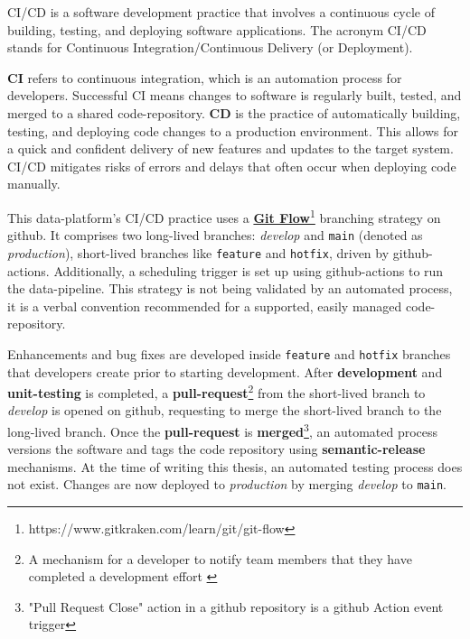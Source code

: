CI/CD is a software development practice that involves a continuous cycle of building, testing, and deploying software applications. The acronym CI/CD stands for Continuous Integration/Continuous Delivery (or Deployment).

\textbf{CI} refers to continuous integration, which is an automation process for developers. Successful CI means changes to software is regularly built, tested, and merged to a shared \gls{code-repository}. \textbf{CD} is the practice of automatically building, testing, and deploying code changes to a production environment. This allows for a quick and confident delivery of new features and updates to the target system. CI/CD mitigates risks of errors and delays that often occur when deploying code manually.

This \gls{data-platform}'s CI/CD practice uses a \href{https://www.gitkraken.com/learn/git/git-flow}{\textbf{Git Flow}}\footnote{https://www.gitkraken.com/learn/git/git-flow} branching strategy on \gls{github}. It comprises two long-lived branches: \textit{develop} and \texttt{main} (denoted as \textit{production}), short-lived branches like \texttt{feature} and \texttt{hotfix}, driven by \gls{github-actions}. Additionally, a scheduling trigger is set up using \gls{github-actions} to run the \gls{data-pipeline}. This strategy is not being validated by an automated process, it is a verbal convention recommended for a supported, easily managed \gls{code-repository}.

Enhancements and bug fixes are developed inside \texttt{feature} and \texttt{hotfix} branches that developers create prior to starting development. After \textbf{development} and \textbf{\gls{unit-testing}} is completed, a \textbf{pull-request}\footnote{A mechanism for a developer to notify team members that they have completed a development effort \cite{atlassian2022pullrequest}} from the short-lived branch to \textit{develop} is opened on \gls{github}, requesting to merge the short-lived branch to the long-lived branch. Once the \textbf{pull-request} is \textbf{merged}\footnote{"Pull Request Close" action in a \gls{github} repository is a \gls{github} Action event trigger}, an automated process versions the software and tags the code repository using \textbf{\gls{semantic-release}} mechanisms. At the time of writing this thesis, an automated testing process does not exist. Changes are now deployed to \textit{production} by merging \textit{develop} to \texttt{main}.
